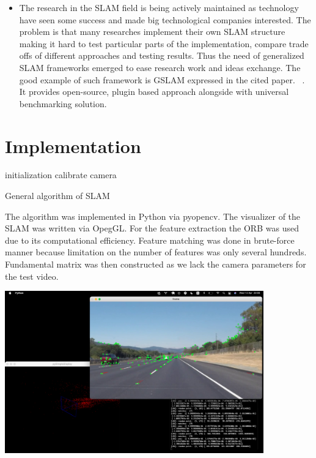 \begin{itemize}
    \item The research in the SLAM field is being actively maintained as technology have seen some success and made big technological companies interested. The problem is that many researches implement their own SLAM structure making it hard to test particular parts of the implementation, compare trade offs of different approaches and testing results. Thus the need of generalized SLAM frameworks emerged to ease research work and ideas exchange. The good example of such framework is GSLAM expressed in the cited paper. ~\cite{GeneralFramework}. It provides open-source, plugin based approach alongside with universal benchmarking solution.
\end{itemize}

\section{Implementation}

\begin{algorithm}[H]

	initialization\;
	calibrate camera\;
	\caption{General algorithm of SLAM}
\end{algorithm}

\vskip 1cm
The algorithm was implemented in Python via pyopencv. The visualizer of the SLAM was written via OpegGL. For the feature extraction the ORB was used due to its computational efficiency. Feature matching was done in brute-force manner because limitation on the number of features was only several hundreds. Fundamental matrix was then constructed as we lack the camera parameters for the test video. 

\begin{center}
    \includegraphics[height=7cm]{res.png}\\[1cm]
\end{center}


